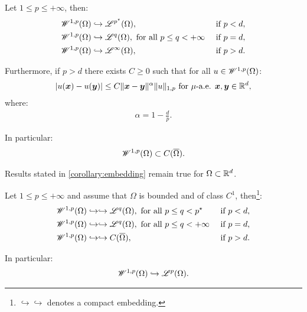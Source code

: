 \begin{corollary}
    Let $1 \leq p \leq +\infty$, then:
    \begin{align}
        & \mathscr{W}^{1, p}(\Omega) \hookrightarrow \mathscr{L}^{p^{\star}}(\Omega), & \text{ if } p < d, \\
        & \mathscr{W}^{1, p}(\Omega) \hookrightarrow \mathscr{L}^{q}(\Omega), \text{ for all } p \leq q < +\infty & \text{ if } p = d, \\
        & \mathscr{W}^{1, p}(\Omega) \hookrightarrow \mathscr{L}^{\infty}(\Omega), & \text{ if } p > d.
    \end{align}

    Furthermore, if $p > d$ there exists $C \geq 0$ such that for all $u \in \mathscr{W}^{1, p}(\Omega)$:
    \begin{gather}
        \lvert u(\bm{x}) - u(\bm{y}) \rvert \leq C \lVert \bm{x} - \bm{y} \rVert^{\alpha} \lVert u \rVert_{1, p} \text{ for } \mu \text{-a.e. } \bm{x}, \bm{y} \in \mathbb{R}^{d},
    \end{gather}
    where:
    \begin{gather}
        \alpha = 1 - \frac{d}{p}.
    \end{gather}

    In particular:
    \begin{gather}
        \mathscr{W}^{1, p}(\Omega) \subset C(\overline{\Omega}).
    \end{gather}
\end{corollary}

\begin{corollary}
    Results stated in \ref{corollary:embedding} remain true for $\Omega \subset \mathbb{R}^{d}$.
\end{corollary}

\begin{theorem}
    Let $1 \leq p \leq +\infty$ and assume that $\Omega$ is bounded and of class $C^1$, then\footnote{$\hookrightarrow \hookrightarrow$ denotes a compact embedding.}:
    \begin{align}
        & \mathscr{W}^{1, p}(\Omega) \hookrightarrow \hookrightarrow \mathscr{L}^{q}(\Omega), \text{ for all } p \leq q < p^{\star} & \text{ if } p < d, \\
        & \mathscr{W}^{1, p}(\Omega) \hookrightarrow \hookrightarrow \mathscr{L}^{q}(\Omega), \text{ for all } p \leq q < +\infty & \text{ if } p = d, \\
        & \mathscr{W}^{1, p}(\Omega) \hookrightarrow \hookrightarrow C(\overline{\Omega}), & \text{ if } p > d.
    \end{align}

    In particular:
    \begin{gather}
        \mathscr{W}^{1, p}(\Omega) \hookrightarrow \mathscr{L}^{p}(\Omega).
    \end{gather}
\end{theorem}

